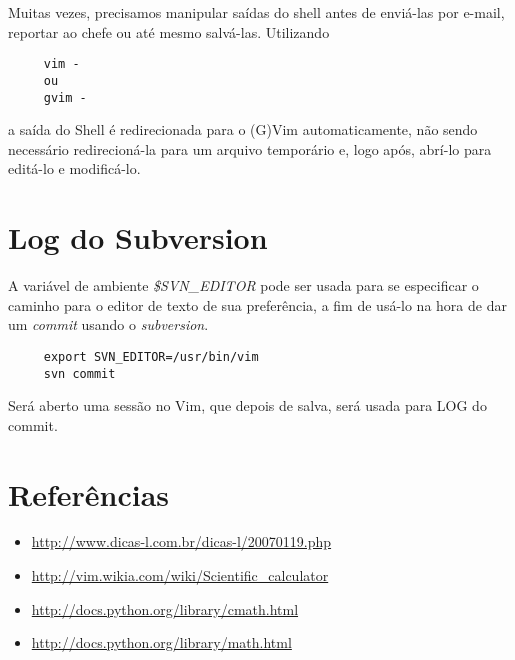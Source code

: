 Muitas vezes, precisamos manipular saídas do shell antes de enviá-las por e-mail, reportar ao chefe ou até mesmo 
salvá-las. Utilizando

\begin{verbatim}
     vim -
     ou
     gvim -
\end{verbatim}

a saída do Shell é redirecionada para o (G)Vim automaticamente, não sendo necessário redirecioná-la para um arquivo
temporário e, logo após, abrí-lo para editá-lo e modificá-lo.

\section{Log do Subversion}

A variável de ambiente {\em \$SVN\_EDITOR} pode ser usada para se especificar o caminho para o editor de texto de
sua preferência, a fim de usá-lo na hora de dar um {\em commit} usando o {\em subversion}.

\begin{verbatim}
     export SVN_EDITOR=/usr/bin/vim
     svn commit
\end{verbatim}

Será aberto uma sessão no Vim, que depois de salva, será usada para LOG do commit.

\section{Referências}

\begin{itemize}
 \item \url{http://www.dicas-l.com.br/dicas-l/20070119.php}
 \item \url{http://vim.wikia.com/wiki/Scientific_calculator}
 \item \url{http://docs.python.org/library/cmath.html}
 \item \url{http://docs.python.org/library/math.html}
\end{itemize}


